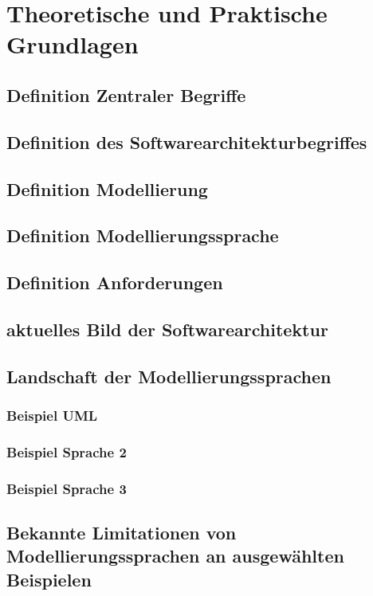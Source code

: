 

\lstset{language=C}

\chapter{Theoretische und Praktische Grundlagen }

\section{Definition Zentraler Begriffe}

\section{Definition des Softwarearchitekturbegriffes}

\section{Definition Modellierung}

\section{Definition Modellierungssprache}

\section{Definition Anforderungen}

\section{aktuelles Bild der Softwarearchitektur}

\section{Landschaft der Modellierungssprachen}

\subsection{Beispiel UML}

\subsection{Beispiel Sprache 2}

\subsection{Beispiel Sprache 3}

\section{Bekannte Limitationen von Modellierungssprachen an ausgewählten Beispielen}


